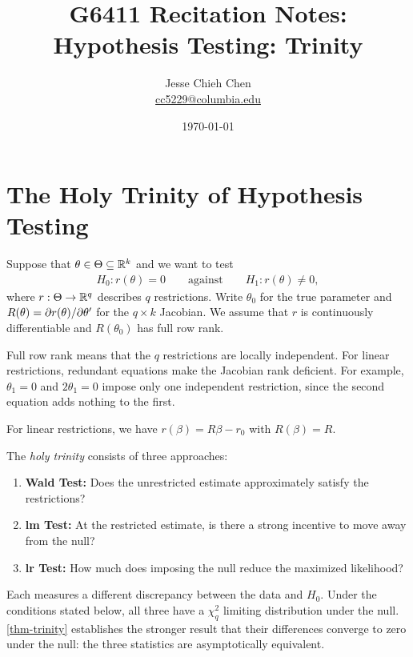 \documentclass[a4paper,12pt]{article}
\title{G6411 Recitation Notes: Hypothesis Testing: Trinity}
\author{Jesse Chieh Chen\\\href{mailto:cc5229@columbia.edu}{cc5229@columbia.edu}}
\date{\today}
\begin{document}
\maketitle

\section{The Holy Trinity of Hypothesis Testing}

Suppose that $\theta\in\Theta\subseteq\mathbb{R}^k$ and we want to test
\begin{align}
	H_0:r(\theta)=0
	\qquad\text{against}\qquad
	H_1:r(\theta)\ne0,
\end{align}
where $r:\Theta\to\mathbb{R}^q$ describes $q$ restrictions.
Write $\theta_0$ for the true parameter and
$R(\theta)=\partial r(\theta)/\partial\theta^{\prime}$ for the $q\times k$ Jacobian.
We assume that $r$ is continuously differentiable and $R(\theta_0)$ has full row rank.

\begin{remark}
	Full row rank means that the $q$ restrictions are locally independent.
	For linear restrictions, redundant equations make the Jacobian rank deficient.
	For example, $\theta_1=0$ and $2\theta_1=0$ impose only one independent restriction, since the second equation adds nothing to the first.
\end{remark}

\begin{remark}
	For linear restrictions, we have $r(\beta)=R\beta-r_0$ with $R(\beta)=R$.
\end{remark}

\noindent
The \emph{holy trinity} consists of three approaches:
\begin{enumerate}
	\item \textbf{Wald Test:} Does the unrestricted estimate approximately satisfy the restrictions?
	\item \textbf{\gls{lm} Test:} At the restricted estimate, is there a strong incentive to move away from the null?
	\item \textbf{\gls{lr} Test:} How much does imposing the null reduce the maximized likelihood?
\end{enumerate}
Each measures a different discrepancy between the data and $H_0$.
Under the conditions stated below, all three have a $\chi_q^2$ limiting distribution under the null.
\autoref{thm-trinity} establishes the stronger result that their differences converge to zero under the null:
the three statistics are asymptotically equivalent.
\end{document}
